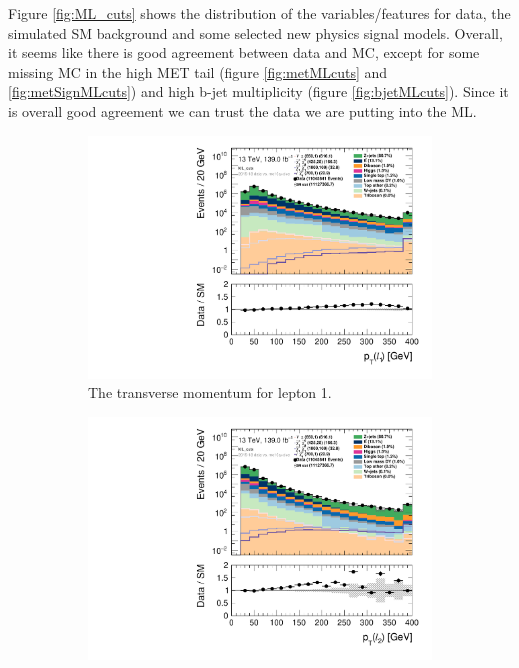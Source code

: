 Figure \ref{fig:ML_cuts} shows the distribution of the variables/features for data, the simulated SM background and some selected new physics signal models. Overall, it seems like there is good agreement between data and MC, except for some missing MC in the high MET tail (figure \ref{fig:metMLcuts} and \ref{fig:metSignMLcuts}) and high b-jet multiplicity (figure \ref{fig:bjetMLcuts}). Since it is overall good agreement we can trust the data we are putting into the ML.

\begin{figure}[H]
\centering
    \begin{subfigure}[t!]{0.49\textwidth}
        \includegraphics[width=\textwidth]{Figures/ML_cuts/hist1d_lepPt[0]_ML_cuts.pdf}
    \caption{The transverse momentum for lepton 1.}
    \label{fig:my_label}
    \end{subfigure}
    \begin{subfigure}[t!]{0.49\textwidth}
        \includegraphics[width=\textwidth]{Figures/ML_cuts/hist1d_lepPt[1]_ML_cuts.pdf}

\end{subfigure}
\end{figure}
